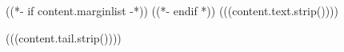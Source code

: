 \begin{itemize}
((*- if content.marginlist -*))
\setupmarginlist
((*- endif *))
(((content.text.strip())))
\end{itemize}
(((content.tail.strip())))

